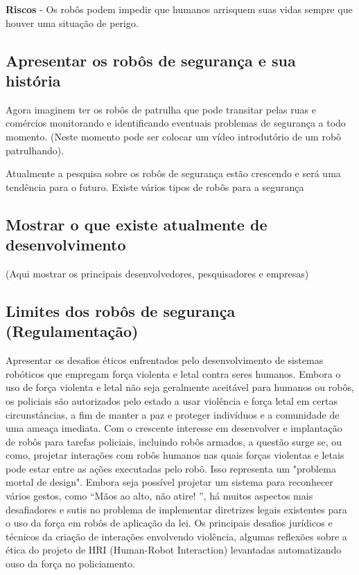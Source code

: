 \documentclass[12pt,a4paper]{article}
\begin{document}
    \textbf{Riscos} - Os robôs podem impedir que humanos arrisquem suas vidas sempre que houver uma situação de perigo.

    \subsection{Apresentar os robôs de segurança e sua história}
    Agora imaginem ter os robôs de patrulha que pode transitar pelas ruas e comércios monitorando e identificando eventuais problemas de segurança a todo momento.  (Neste momento pode ser colocar um vídeo introdutório de um robô patrulhando).

    Atualmente a pesquisa sobre os robôs de segurança estão crescendo e será uma tendência para o futuro. Existe vários tipos de robôs para a segurança

    \subsection{Mostrar o que existe atualmente de desenvolvimento}
    (Aqui mostrar os principais desenvolvedores, pesquisadores e empresas)
    


    \subsection{Limites dos robôs de segurança (Regulamentação)}
    Apresentar os desafios éticos enfrentados pelo desenvolvimento de sistemas robóticos que empregam força violenta e letal contra seres humanos. Embora o uso de força violenta e letal não seja geralmente aceitável para humanos ou robôs, os policiais são autorizados pelo estado a usar violência e força letal em certas circunstâncias, a fim de manter a paz e proteger indivíduos e a comunidade de uma ameaça imediata. Com o crescente interesse em desenvolver e implantação de robôs para tarefas policiais, incluindo robôs armados, a questão surge se, ou como, projetar interações com robôs humanos nas quais forças violentas e letais pode estar entre as ações executadas pelo robô. Isso representa um "problema mortal de design". Embora seja possível projetar um sistema para reconhecer vários gestos, como “Mãos ao alto, não atire! ”, há muitos aspectos mais desafiadores e sutis no problema de implementar diretrizes legais existentes para o uso da força em robôs de aplicação da lei. Os principais desafios jurídicos e técnicos da criação de interações envolvendo violência, algumas reflexões sobre a ética do projeto de HRI (Human-Robot Interaction) levantadas automatizando ouso da força no policiamento.  
\end{document}

